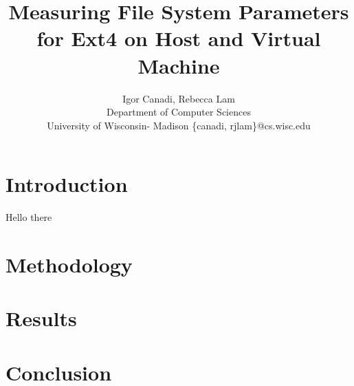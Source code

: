 \documentclass{sig-alternate}
\begin{document}
\title{Measuring File System Parameters for Ext4 on Host and Virtual Machine}

\author{
	Igor Canadi, Rebecca Lam\\
	Department of Computer Sciences\\
	University of Wisconsin- Madison
	\{canadi, rjlam\}@cs.wisc.edu
}

\maketitle

\section{Introduction}
\label{sec:intro}
Hello there

\section{Methodology}
\label{sec:method}

\section{Results}
\label{sec:results}

\section{Conclusion}
\label{sec:conc}
\end{document}
